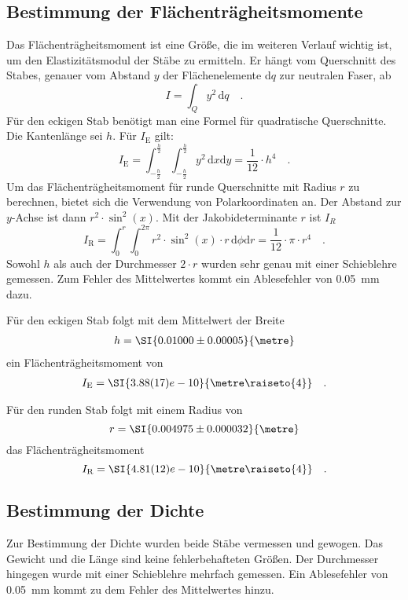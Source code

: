 \subsection{Bestimmung der Flächenträgheitsmomente}
Das Flächenträgheitsmoment ist eine Größe, die im weiteren Verlauf wichtig ist, um den Elastizitätsmodul der Stäbe zu ermitteln.
Er hängt vom Querschnitt des Stabes, genauer vom Abstand $y$ der Flächenelemente d$q$ zur neutralen Faser, ab
\begin{equation}
I = \int_{Q} y ^2 \, \text{d}q \quad .
\end{equation}
Für den eckigen Stab benötigt man eine Formel für quadratische Querschnitte. Die Kantenlänge sei $h$. Für $I_\text{E}$ gilt:
\begin{equation}
I_\text{E} = \int_{-\frac{h}{2}}^{\frac{h}{2}} \int_{-\frac{h}{2}}^{\frac{h}{2}} y^2\,  \text{d}x \text{d}y = \frac{1}{12} \cdot h^4 \quad .
\end{equation}
Um das Flächenträgheitsmoment für runde Querschnitte mit Radius $r$ zu berechnen, bietet sich die Verwendung von Polarkoordinaten an. Der Abstand zur $y$-Achse ist dann $r^2 \cdot \sin^2(x)$.  Mit der Jakobideterminante $r$ ist $I_R$
\begin{equation}
I_\text{R} = \int_{0}^{r}  \int_{0}^{2\pi} r^2 \cdot \sin^2(x) \cdot r  \, \text{d}\phi \text{d}r = \frac{1}{12}\cdot \pi \cdot r^4 \quad .
\end{equation}
Sowohl $h$ als auch der Durchmesser $2 \cdot r$ wurden sehr genau mit einer Schieblehre gemessen. Zum Fehler des Mittelwertes kommt ein Ablesefehler von \SI{0.05}{\milli\metre} dazu.



Für den eckigen Stab folgt mit dem Mittelwert der Breite
\begin{align}
  h = \SI{0.01000 \pm 0.00005}{\metre}
\end{align}
ein Flächenträgheitsmoment von
\begin{align}
I_\text{E}=\SI{3.88(17)e-10}{\metre\raiseto{4}} \quad .
\end{align}

Für den runden Stab folgt mit einem Radius von
\begin{equation}
  r = \SI{0.004975 \pm 0.000032}{\metre}
\end{equation}
das Flächenträgheitsmoment
\begin{equation}
  I_\text{R} = \SI{4.81(12)e-10}{\metre\raiseto{4}} \quad .
\end{equation}









\subsection{Bestimmung der Dichte}
Zur Bestimmung der Dichte wurden beide Stäbe vermessen und gewogen. Das Gewicht und die Länge sind keine fehlerbehafteten Größen. Der Durchmesser hingegen wurde mit einer Schieblehre mehrfach gemessen. Ein Ablesefehler von \SI{0.05}{\milli\metre}  kommt zu dem Fehler des Mittelwertes hinzu.
